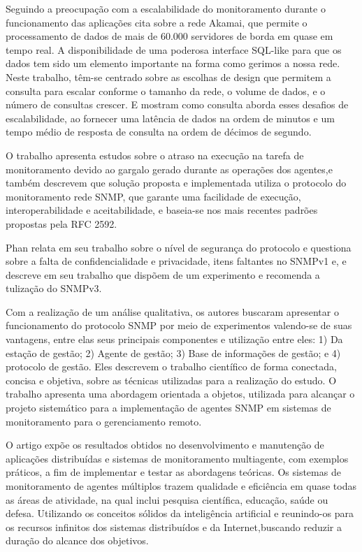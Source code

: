 Seguindo a preocupação com a escalabilidade do monitoramento durante o funcionamento das aplicações \cite{repantis2010scaling} cita sobre a rede Akamai, que permite o processamento de dados de mais de 60.000 servidores de borda em quase em tempo real. A disponibilidade de uma poderosa interface SQL-like para que os dados tem sido um elemento importante na forma como gerimos a nossa rede. Neste trabalho, têm-se centrado sobre as escolhas de design que permitem a consulta para escalar conforme o tamanho da rede, o volume de dados, e o número de consultas crescer. E mostram como consulta aborda esses desafios de escalabilidade, ao fornecer uma latência de dados na ordem de minutos e um tempo médio de resposta de consulta na ordem de décimos de segundo.

O trabalho \cite{subramanyan2000scalable} apresenta estudos sobre o atraso na execução na tarefa de monitoramento devido ao gargalo gerado durante as operações dos agentes,e também descrevem que solução proposta e implementada utiliza o protocolo do monitoramento rede \acrshort{SNMP}, que garante uma facilidade de execução, interoperabilidade e aceitabilidade, e baseia-se nos mais recentes padrões propostas pela RFC 2592.  

Phan \cite{phan2009cryptanalysis} relata em seu trabalho sobre o nível de segurança do protocolo e questiona sobre a falta de confidencialidade e privacidade, itens faltantes no SNMPv1 e, e descreve em seu trabalho  que dispõem de um experimento e recomenda a tulização do SNMPv3.

Com a realização de um análise qualitativa, os autores \cite{lee2004design} buscaram apresentar o funcionamento do protocolo SNMP por meio de experimentos valendo-se de suas vantagens, entre elas seus principais componentes e utilização entre eles: 1) Da estação de gestão; 2) Agente de gestão; 3) Base de informações de gestão; e 4) protocolo de gestão. Eles descrevem o trabalho científico de forma conectada, concisa e objetiva, sobre as técnicas utilizadas para a realização do estudo. O trabalho apresenta uma abordagem orientada a objetos, utilizada para alcançar o projeto sistemático para a implementação de agentes SNMP em sistemas de monitoramento para o gerenciamento remoto.

O artigo \cite{puatruct2010agent} expõe os resultados obtidos no desenvolvimento e manutenção de aplicações distribuídas e sistemas de monitoramento multiagente, com exemplos práticos, a fim de implementar e testar as abordagens teóricas. Os sistemas de monitoramento de agentes múltiplos trazem qualidade e eficiência em quase todas as áreas de atividade, na qual inclui pesquisa científica, educação, saúde ou defesa.
Utilizando os conceitos sólidos da inteligência artificial e reunindo-os para os recursos infinitos dos sistemas distribuídos e da Internet,buscando reduzir a duração do alcance dos objetivos.

